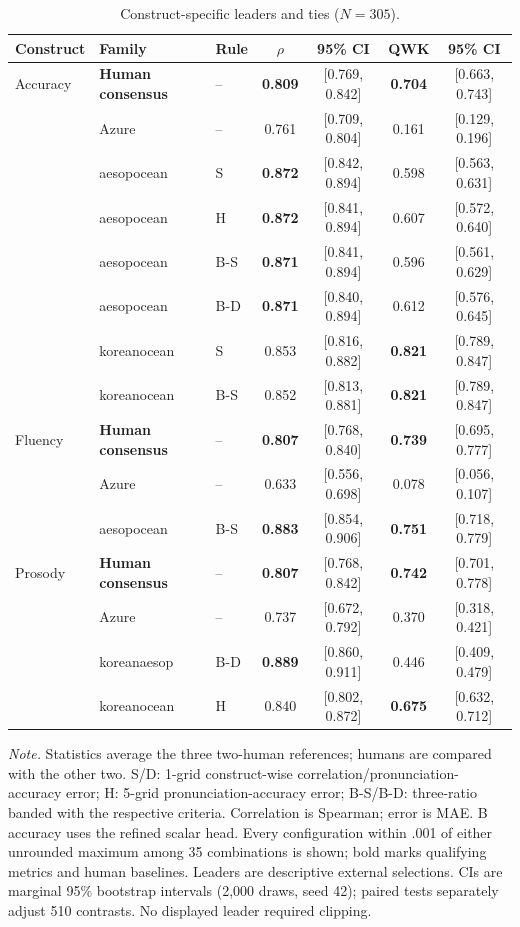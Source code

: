 \documentclass[cameraready]{Interspeech}
\begin{document}
\begin{table}[t]
\centering
\small
\setlength{\tabcolsep}{5pt}
\renewcommand{\arraystretch}{1.0}
\caption{Construct-specific leaders and ties ($N=305$).}
\label{tab:external}
\begin{tabular}{@{}lllcccc@{}}
\toprule
Construct & Family & Rule & $\rho$ & 95\% CI & QWK & 95\% CI\\
\midrule
Accuracy & \textbf{Human consensus} & -- & \textbf{0.809} & [0.769, 0.842] & \textbf{0.704} & [0.663, 0.743]\\
 & Azure & -- & 0.761 & [0.709, 0.804] & 0.161 & [0.129, 0.196]\\
 & aesopocean & S & \textbf{0.872} & [0.842, 0.894] & 0.598 & [0.563, 0.631]\\
 & aesopocean & H & \textbf{0.872} & [0.841, 0.894] & 0.607 & [0.572, 0.640]\\
 & aesopocean & B-S & \textbf{0.871} & [0.841, 0.894] & 0.596 & [0.561, 0.629]\\
 & aesopocean & B-D & \textbf{0.871} & [0.840, 0.894] & 0.612 & [0.576, 0.645]\\
 & koreanocean & S & 0.853 & [0.816, 0.882] & \textbf{0.821} & [0.789, 0.847]\\
 & koreanocean & B-S & 0.852 & [0.813, 0.881] & \textbf{0.821} & [0.789, 0.847]\\
\midrule
Fluency & \textbf{Human consensus} & -- & \textbf{0.807} & [0.768, 0.840] & \textbf{0.739} & [0.695, 0.777]\\
 & Azure & -- & 0.633 & [0.556, 0.698] & 0.078 & [0.056, 0.107]\\
 & aesopocean & B-S & \textbf{0.883} & [0.854, 0.906] & \textbf{0.751} & [0.718, 0.779]\\
\midrule
Prosody & \textbf{Human consensus} & -- & \textbf{0.807} & [0.768, 0.842] & \textbf{0.742} & [0.701, 0.778]\\
 & Azure & -- & 0.737 & [0.672, 0.792] & 0.370 & [0.318, 0.421]\\
 & koreanaesop & B-D & \textbf{0.889} & [0.860, 0.911] & 0.446 & [0.409, 0.479]\\
 & koreanocean & H & 0.840 & [0.802, 0.872] & \textbf{0.675} & [0.632, 0.712]\\
\bottomrule
\end{tabular}
\par\smallskip
\begin{minipage}{\textwidth}
\footnotesize
\textit{Note.} Statistics average the three two-human references; humans are compared with the other two. S/D: 1-grid construct-wise correlation/pronunciation-accuracy error; H: 5-grid pronunciation-accuracy error; B-S/B-D: three-ratio banded with the respective criteria. Correlation is Spearman; error is MAE. B accuracy uses the refined scalar head. Every configuration within .001 of either unrounded maximum among 35 combinations is shown; bold marks qualifying metrics and human baselines. Leaders are descriptive external selections. CIs are marginal 95\% bootstrap intervals (2,000 draws, seed 42); paired tests separately adjust 510 contrasts. No displayed leader required clipping.
\end{minipage}
\end{table}
\end{document}
